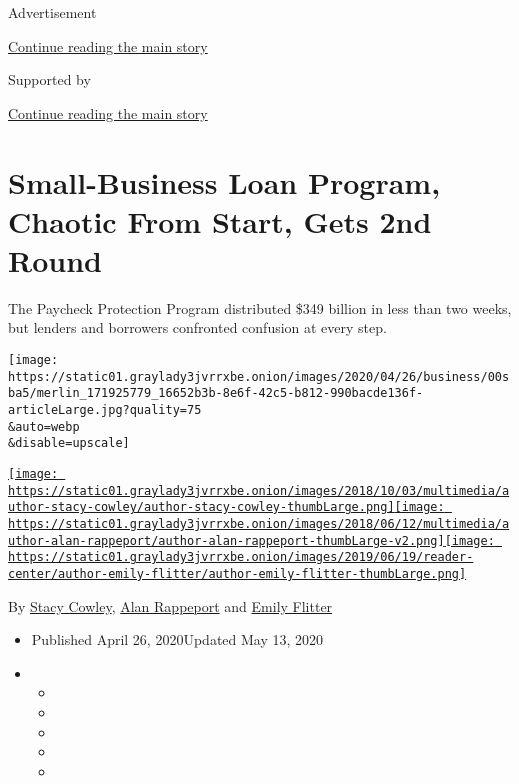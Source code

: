 Advertisement

\protect\hyperlink{after-top}{Continue reading the main story}

Supported by

\protect\hyperlink{after-sponsor}{Continue reading the main story}

\hypertarget{small-business-loan-program-chaotic-from-start-gets-2nd-round}{%
\section{Small-Business Loan Program, Chaotic From Start, Gets 2nd
Round}\label{small-business-loan-program-chaotic-from-start-gets-2nd-round}}

The Paycheck Protection Program distributed \$349 billion in less than
two weeks, but lenders and borrowers confronted confusion at every step.

\texttt{[image: https://static01.graylady3jvrrxbe.onion/images/2020/04/26/business/00sba5/merlin\_171925779\_16652b3b-8e6f-42c5-b812-990bacde136f-articleLarge.jpg?quality=75\\\&auto=webp\\\&disable=upscale]}

\href{https://www.nytimes3xbfgragh.onion/by/stacy-cowley}{\texttt{[image: https://static01.graylady3jvrrxbe.onion/images/2018/10/03/multimedia/author-stacy-cowley/author-stacy-cowley-thumbLarge.png]}}\href{https://www.nytimes3xbfgragh.onion/by/alan-rappeport}{\texttt{[image: https://static01.graylady3jvrrxbe.onion/images/2018/06/12/multimedia/author-alan-rappeport/author-alan-rappeport-thumbLarge-v2.png]}}\href{https://www.nytimes3xbfgragh.onion/by/emily-flitter}{\texttt{[image: https://static01.graylady3jvrrxbe.onion/images/2019/06/19/reader-center/author-emily-flitter/author-emily-flitter-thumbLarge.png]}}

By \href{https://www.nytimes3xbfgragh.onion/by/stacy-cowley}{Stacy
Cowley},
\href{https://www.nytimes3xbfgragh.onion/by/alan-rappeport}{Alan
Rappeport} and
\href{https://www.nytimes3xbfgragh.onion/by/emily-flitter}{Emily
Flitter}

\begin{itemize}
\item
  Published April 26, 2020Updated May 13, 2020
\item
  \begin{itemize}
  \item
  \item
  \item
  \item
  \item
  \end{itemize}
\end{itemize}

